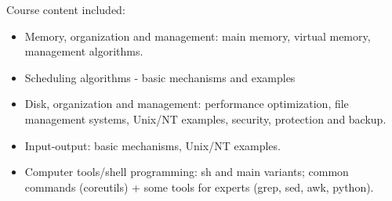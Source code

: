 Course content included:
\begin{itemize}
    \item Memory, organization and management: main memory, virtual memory, management algorithms.
    \item Scheduling algorithms - basic mechanisms and examples
    \item Disk, organization and management: performance optimization, file management systems, Unix/NT examples, security, protection and backup.
    \item Input-output: basic mechanisms, Unix/NT examples.
    \item Computer tools/shell programming: sh and main variants; common commands (coreutils) + some tools for experts (grep, sed, awk, python).
\end{itemize}